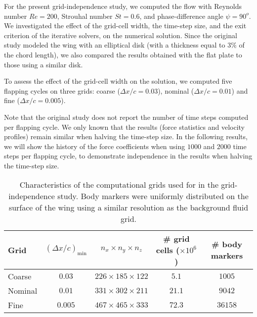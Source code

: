 For the present grid-independence study, we computed the flow with Reynolds number $Re = 200$, Strouhal number $St = 0.6$, and phase-difference angle $\psi = 90^o$.
We investigated the effect of the grid-cell width, the time-step size, and the exit criterion of the iterative solvers, on the numerical solution.
Since the original study modeled the wing with an elliptical disk (with a thickness equal to $3\%$ of the chord length), we also compared the results obtained with the flat plate to those using a similar disk.

To assess the effect of the grid-cell width on the solution, we computed five flapping cycles on three grids: coarse ($\Delta x / c = 0.03$), nominal ($\Delta x / c = 0.01$) and fine ($\Delta x / c = 0.005$).

Note that the original study does not report the number of time steps computed per flapping cycle.
We only known that the results (force statistics and velocity profiles) remain similar when halving the time-step size.
In the following results, we will show the history of the force coefficients when using $1000$ and $2000$ time steps per flapping cycle, to demonstrate independence in the results when halving the time-step size.

\begin{table}
  \centering
  \begin{tabular}{lcccc}
    \hline\hline
    Grid & $(\Delta x / c)_\text{min}$ & $n_x \times n_y \times n_z$ & \# grid cells ($\times 10^6$) & \# body markers \\
    \hline
    Coarse & $0.03$ & $226 \times 185 \times 122$ & $5.1$ & $1005$ \\
    Nominal & $0.01$ & $331 \times 302 \times 211$ & $21.1$ & $9042$ \\
    Fine & $0.005$ & $467 \times 465 \times 333$ & $72.3$ & $36158$ \\
    \hline\hline
  \end{tabular}
  \caption{Characteristics of the computational grids used for in the grid-independence study. Body markers were uniformly distributed on the surface of the wing using a similar resolution as the background fluid grid.}
  \label{tab:independence_grid_charateristics}
\end{table}

